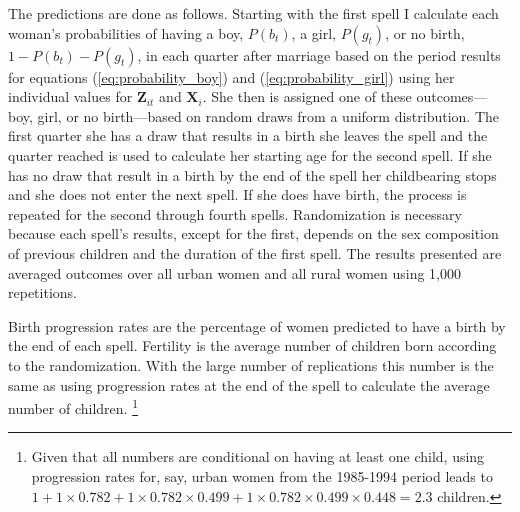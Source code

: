 \documentclass[12pt,letterpaper]{article}
\begin{document}
The predictions are done as follows.
Starting with the first spell I calculate each woman's probabilities of having a boy,
$P(b_t)$, a girl, $P(g_t)$, or no birth, $1-P(b_t)-P(g_t)$, in each quarter after marriage
based on the period results for 
equations (\ref{eq:probability_boy}) and (\ref{eq:probability_girl}) using her individual 
values for $\mathbf{Z}_{it}$ and $\mathbf{X}_{i}$.
She then is assigned one of these outcomes---boy, girl, or no birth---based on random 
draws from a uniform distribution.
The first quarter she has a draw that results in a birth she leaves the spell
and the quarter reached is used to calculate her starting age for the second spell.
If she has no draw that result in a birth by the end of the spell her childbearing 
stops and she does not enter the next spell.
If she does have birth, the process is repeated for the second through fourth spells.
Randomization is necessary because each spell's results, except for the first, depends on
the sex composition of previous children and the duration of the first spell. 
The results presented are averaged outcomes over all urban women and all rural women 
using 1,000 repetitions.


Birth progression rates are the percentage of women predicted to have a birth 
by the end of each spell.
Fertility is the average number of children born according to the randomization.
With the large number of replications this number is the same as using progression
rates at the end of the spell to calculate the average number of children.%
\footnote{
Given that all numbers are conditional on having at least one child, using progression
rates for, say, urban women from the 1985-1994 period leads to 
$1+1\times0.782+1\times0.782\times0.499+1\times0.782\times0.499\times0.448=2.3 $  
children.
}
\end{document}
